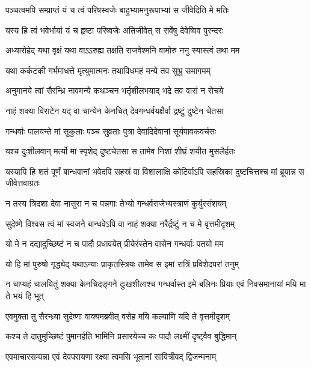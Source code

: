 \twolineshloka
{पञ्चत्वमपि सम्प्राप्तं यं च त्वं परिषस्वजेः}
{बाहुभ्यामनुरूपाभ्यां स जीवेदिति मे मतिः}


\twolineshloka
{यस्य हि त्वं भवेर्भार्या यं च हृष्टा परिष्वजेः}
{अतिजीवेत् स सर्वेषु देवेष्विव पुरन्दरः}


\twolineshloka
{अध्यारोहेद् यथा वृक्षं यथा वाऽऽरुह्य तक्षति}
{राजवेश्मनि वामोरु ननु स्यास्त्वं तथा मम}


\twolineshloka
{यथा कर्कटकी गर्भमाधत्ते मृत्युमात्मनः}
{तथाविधमहं मन्ये तव सुभ्रु समागमम्}


\twolineshloka
{अनुमानये त्वां सैरन्ध्रि नावमन्ये कथञ्चन}
{भर्तृशीलभयाद् भद्रे तव वासं न रोचये}




\twolineshloka
{नाहं शक्या विराटेन यद् वा चान्येन केनचित्}
{देवगन्धर्वयक्षैर्वा द्रष्टुं दुष्टेन चेतसा}


\twolineshloka
{गन्धर्वाः पालयन्ते मां सुकुलाः पञ्च सुव्रताः}
{पुत्रा देवादिदेवानां सूर्यपावकवर्चसः}


\twolineshloka
{यश्च दुःशीलवान् मर्त्यो मां स्पृशेद् दुष्टचेतसा}
{स तामेव निशां शीघ्रं शयीत मुसलैर्हतः}


\threelineshloka
{यस्यापि हि शतं पूर्णं बान्धवानां भवेदपि}
{सहस्रं वा विशालाक्षि कोटिर्वाऽपि सहस्रिका}
{दुष्टचित्तश्च मां ब्रूयान्न स जीवेत्तवाग्रतः}


\twolineshloka
{न तस्य त्रिदशा देवा नासुरा न च पन्नगाः}
{तेभ्यो गन्धर्वराजेभ्यस्त्राणं कुर्युरसंशयम्}


\twolineshloka
{सुदेष्णे विश्वस त्वं मां स्वजने बान्धवेऽपि वा}
{नाहं शक्या नरैर्द्रष्टुं न च मे वृत्तमीदृशम्}


\twolineshloka
{यो मे न दद्यादुच्छिष्टं न च पादौ प्रधावयेत्}
{प्रीयेरंस्तेन वासेन गन्धर्वाः पतयो मम}


\twolineshloka
{यो हि मां पुरुषो गृद्ध्येद् यथाऽन्याः प्राकृतस्त्रियः}
{तामेव स इमां रात्रिं प्रविशेदपरां तनुम्}


\threelineshloka
{न चाप्यहं चालयितुं शक्या केनचिदङ्गने}
{दुःखशीलाश्च गन्धर्वास्त इमे बलिनः प्रियाः}
{एवं निवसमानायां मयि मा ते भयं हि भूत्}



\twolineshloka
{एवमुक्ता तु सैरन्ध्र्या सुदेष्णा वाक्यमब्रवीत्}
{वसेह मयि कल्याणि यदि ते वृत्तमीदृशम्}


\twolineshloka
{कश्च ते दातुमुच्छिष्टं पुमानर्हति भामिनि}
{प्रसारयेच्च कः पादौ लक्ष्मीं दृष्ट्वैव बुद्धिमान्}


\twolineshloka
{एवमाचारसम्पन्ना एवं देवपरायणा}
{रक्ष्या त्वमसि भूतानां सावित्रीवद् द्विजन्मनाम्}


